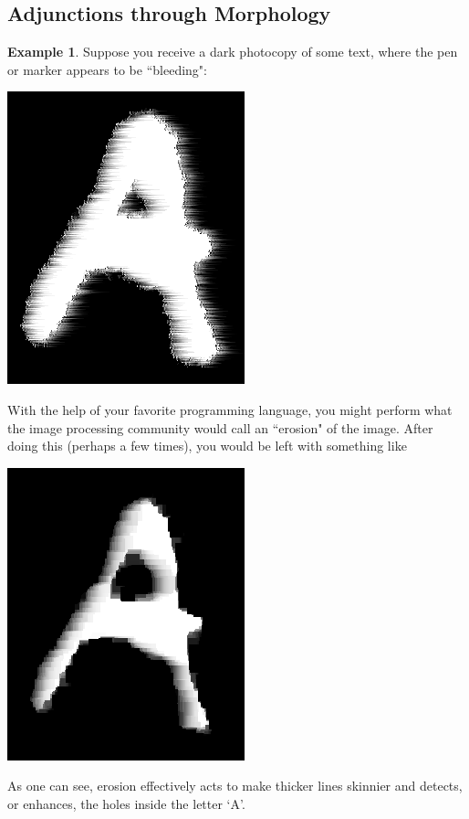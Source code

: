 \documentclass[11pt]{book}
\theoremstyle{definition}
\newtheorem{example}{Example}[section]
\theoremstyle{definition}
\theoremstyle{definition}
\theoremstyle{theorem}
\theoremstyle{definition}
\begin{document}
\subsection{Adjunctions through Morphology}
\begin{example}
	Suppose you receive a dark photocopy of some text, where the pen or marker appears to be ``bleeding": 
	\begin{center}
		\includegraphics*[scale=0.25]{LetterAOriginal.png}
	\end{center}
	With the help of your favorite programming language, you might perform what the image processing community would call an ``erosion"  of the image. After doing this (perhaps a few times), you would be left with something like
	\begin{center}
		\includegraphics*[scale=0.25]{LetterAAfterErode.png}
	\end{center} 
	As one can see, erosion effectively acts to make thicker lines skinnier and detects, or enhances, the holes inside the letter `A'. \par 

\end{example}
\end{document}
